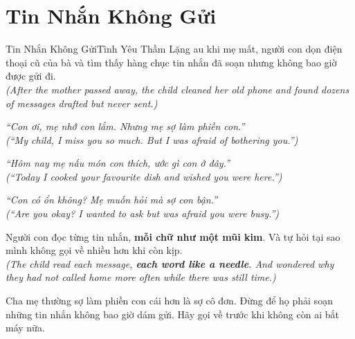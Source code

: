 \section{Tin Nhắn Không Gửi}
\begin{truyen}{Tin Nhắn Không Gửi}{Tình Yêu Thầm Lặng}
au khi mẹ mất, người con dọn điện thoại cũ của bà và tìm thấy hàng chục tin nhắn đã soạn nhưng không bao giờ được gửi đi.\\
\textit{(After the mother passed away, the child cleaned her old phone and found dozens of messages drafted but never sent.)}

\textit{``Con ơi, mẹ nhớ con lắm. Nhưng mẹ sợ làm phiền con.''}\\
\textit{(``My child, I miss you so much. But I was afraid of bothering you.'')}

\textit{``Hôm nay mẹ nấu món con thích, ước gì con ở đây.''}\\
\textit{(``Today I cooked your favourite dish and wished you were here.'')}

\textit{``Con có ổn không? Mẹ muốn hỏi mà sợ con bận.''}\\
\textit{(``Are you okay? I wanted to ask but was afraid you were busy.'')}

Người con đọc từng tin nhắn, \textbf{mỗi chữ như một mũi kim}. Và tự hỏi tại sao mình không gọi về nhiều hơn khi còn kịp.\\
\textit{(The child read each message, \textbf{each word like a needle}. And wondered why they had not called home more often while there was still time.)}
\end{truyen}
\begin{baihoc}
  Cha mẹ thường sợ làm phiền con cái hơn là sợ cô đơn. Đừng để họ phải soạn những tin nhắn không bao giờ dám gửi. Hãy gọi về trước khi không còn ai bắt máy nữa.
\end{baihoc}

